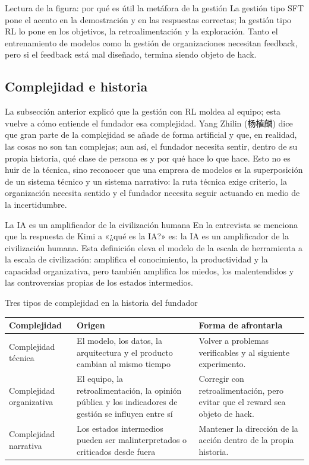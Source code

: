 \documentclass[a4paper]{article}
\begin{document}
\begin{knowledgebox}{Lectura de la figura: por qué es útil la metáfora de la gestión}
La gestión tipo SFT pone el acento en la demostración y en las respuestas correctas; la gestión tipo RL lo pone en los objetivos, la retroalimentación y la exploración. Tanto el entrenamiento de modelos como la gestión de organizaciones necesitan feedback, pero si el feedback está mal diseñado, termina siendo objeto de hack.
\end{knowledgebox}

\subsection{Complejidad e historia}

La subsección anterior explicó que la gestión con RL moldea al equipo; esta vuelve a cómo entiende el fundador esa complejidad. Yang Zhilin (杨植麟) dice que gran parte de la complejidad se añade de forma artificial y que, en realidad, las cosas no son tan complejas; aun así, el fundador necesita sentir, dentro de su propia historia, qué clase de persona es y por qué hace lo que hace. Esto no es huir de la técnica, sino reconocer que una empresa de modelos es la superposición de un sistema técnico y un sistema narrativo: la ruta técnica exige criterio, la organización necesita sentido y el fundador necesita seguir actuando en medio de la incertidumbre.

\begin{importantbox}{La IA es un amplificador de la civilización humana}
En la entrevista se menciona que la respuesta de Kimi a «¿qué es la IA?» es: la IA es un amplificador de la civilización humana. Esta definición eleva el modelo de la escala de herramienta a la escala de civilización: amplifica el conocimiento, la productividad y la capacidad organizativa, pero también amplifica los miedos, los malentendidos y las controversias propias de los estados intermedios.
\end{importantbox}

\begin{knowledgebox}{Tres tipos de complejidad en la historia del fundador}
\begin{tabularx}{\textwidth}{p{}p{}X}
\toprule
Complejidad & Origen & Forma de afrontarla \\
\midrule
Complejidad técnica & El modelo, los datos, la arquitectura y el producto cambian al mismo tiempo & Volver a problemas verificables y al siguiente experimento. \\
Complejidad organizativa & El equipo, la retroalimentación, la opinión pública y los indicadores de gestión se influyen entre sí & Corregir con retroalimentación, pero evitar que el reward sea objeto de hack. \\
Complejidad narrativa & Los estados intermedios pueden ser malinterpretados o criticados desde fuera & Mantener la dirección de la acción dentro de la propia historia. \\
\bottomrule
\end{tabularx}
\end{knowledgebox}
\end{document}
